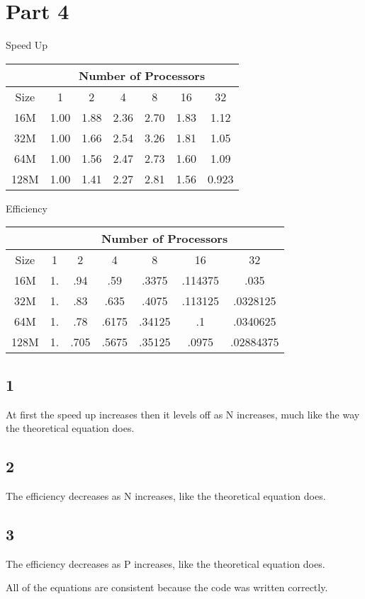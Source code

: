 \documentclass[a4paper,12pt]{article}
\begin{document}
\section*{Part 4}
   \begin{samepage}
    \begin{center}
        Speed Up

        \begin{tabular}{| c | c | c | c | c | c | c |}
            \hline
            ~ & \multicolumn{6}{c|}{Number of Processors}\\
            \hline
            Size & 1 & 2 & 4 & 8 & 16 & 32\\
            \hline
            16M  & 1.00 & 1.88 & 2.36 & 2.70 & 1.83 & 1.12\\
            32M  & 1.00 & 1.66 & 2.54 & 3.26 & 1.81 & 1.05\\
            64M  & 1.00 & 1.56 & 2.47 & 2.73 & 1.60 & 1.09\\
            128M & 1.00 & 1.41 & 2.27 & 2.81 & 1.56 & 0.923\\
            \hline
        \end{tabular}
    \end{center}
   \end{samepage}

\newpage
   \begin{samepage}
    \begin{center}
        Efficiency

        \begin{tabular}{| c | c | c | c | c | c | c |}
            \hline
            ~ & \multicolumn{6}{c|}{Number of Processors}\\
            \hline
            Size & 1 & 2 & 4 & 8 & 16 & 32\\
            \hline
            16M  & 1.   &  .94 &  .59 & .3375 & .114375 & .035\\
            32M  & 1.   & .83  & .635 & .4075 & .113125 & .0328125\\
            64M  & 1.   & .78  & .6175& .34125& .1 & .0340625\\
            128M & 1. &  .705  & .5675& .35125& .0975& .02884375\\
            \hline
        \end{tabular}
    \end{center}
   \end{samepage}

    \subsection*{1}
    At first the speed up increases then it levels off as N increases,
    much like the way the theoretical equation does.
    \subsection*{2}
    The efficiency decreases as N increases, like the theoretical equation does.
    \subsection*{3}
    The efficiency decreases as P increases, like the theoretical equation does.

    All of the equations are consistent because the code was written correctly.
\end{document}
